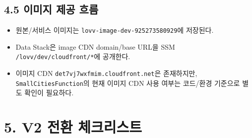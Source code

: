 \documentclass[12pt,a4paper]{article}
\newcommand{\DocNeedspace}[1]{\par\ifdim\dimexpr\pagegoal-\pagetotal\relax<#1\newpage\fi}
\newcommand{\TocNoChildTight}{\vspace{-0.28em}}
\begin{document}
\newpage
\DocNeedspace{24\baselineskip}
\subsection*{4.5 이미지 제공 흐름}


\begin{itemize}
\item 원본/서비스 이미지는 \texttt{lovv-\allowbreak{}image-\allowbreak{}dev-\allowbreak{}925273580929}에 저장된다.
\item Data Stack은 image CDN domain/base URL을 SSM \texttt{/\allowbreak{}lovv/\allowbreak{}dev/\allowbreak{}cloudfront/\allowbreak{}*}에 공개한다.
\item 이미지 CDN \texttt{det7vj7wxfmim.\allowbreak{}cloudfront.\allowbreak{}net}은 존재하지만, \texttt{Small\allowbreak{}Cities\allowbreak{}Function}의 현재 이미지 CDN 사용 여부는 코드/환경 기준으로 별도 확인이 필요하다.
\end{itemize}


\newpage

\DocNeedspace{10\baselineskip}
\section*{5. V2 전환 체크리스트}
\addtocontents{toc}{\protect\TocNoChildTight}
\end{document}
